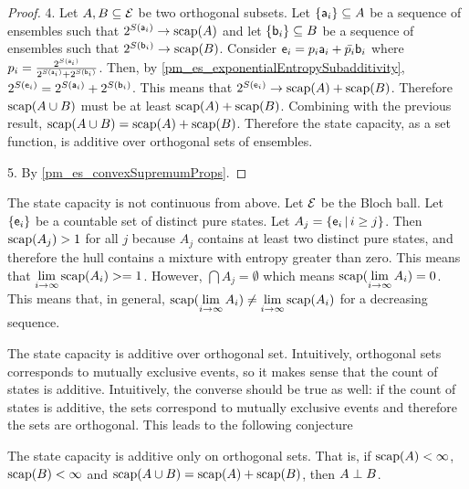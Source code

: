 \begin{mathSection}
\begin{proof}
	4. Let $A, B \subseteq \Ens$ be two orthogonal subsets. Let $\{\ens[a]_i\} \subseteq A$ be a sequence of ensembles such that $2^{S(\ens[a]_i)} \to \scap(A)$ and let $\{\ens[b]_i\} \subseteq B$ be a sequence of ensembles such that $2^{S(\ens[b]_i)} \to \scap(B)$. Consider $\ens_i = p_i \ens[a]_i + \bar{p_i} \ens[b]_i$ where $p_i = \frac{2^{S(\ens[a]_i)}}{2^{S(\ens[a]_i)} + 2^{S(\ens[b]_i)}}$. Then, by \ref{pm_es_exponentialEntropySubadditivity}, $2^{S(\ens_i)} = 2^{S(\ens[a]_i)} + 2^{S(\ens[b]_i)}$. This means that $2^{S(\ens_i)} \to \scap(A) + \scap(B)$. Therefore $\scap(A \cup B)$ must be at least $\scap(A) + \scap(B)$. Combining with the previous result, $\scap(A \cup B) = \scap(A) + \scap(B)$. Therefore the state capacity, as a set function, is additive over orthogonal sets of ensembles.

	5. By \ref{pm_es_convexSupremumProps}.
\end{proof}

\begin{remark}
	The state capacity is not continuous from above. Let $\Ens$ be the Bloch ball. Let $\{\ens_i\}$ be a countable set of distinct pure states. Let $A_j = \{ \ens_i \, | \, i \geq j\}$. Then $\scap(A_j) > 1$ for all $j$ because $A_j$ contains at least two distinct pure states, and therefore the hull contains a mixture with entropy greater than zero. This means that $\lim\limits_{i \to \infty} \scap(A_i) >= 1$. However, $\bigcap A_j = \emptyset$ which means $\scap(\lim\limits_{i \to \infty} A_i) = 0$. This means that, in general, $\scap(\lim\limits_{i \to \infty} A_i) \neq \lim\limits_{i \to \infty} \scap(A_i)$ for a decreasing sequence.
\end{remark}

\end{mathSection}

The state capacity is additive over orthogonal set. Intuitively, orthogonal sets corresponds to mutually exclusive events, so it makes sense that the count of states is additive. Intuitively, the converse should be true as well: if the count of states is additive, the sets correspond to mutually exclusive events and therefore the sets are orthogonal. This leads to the following conjecture

\begin{conj}
	The state capacity is additive only on orthogonal sets. That is, if $\scap(A)<\infty$, $\scap(B)<\infty$ and $\scap(A \cup B) = \scap(A) +\scap(B)$, then $A \ortho B$.
\end{conj}

